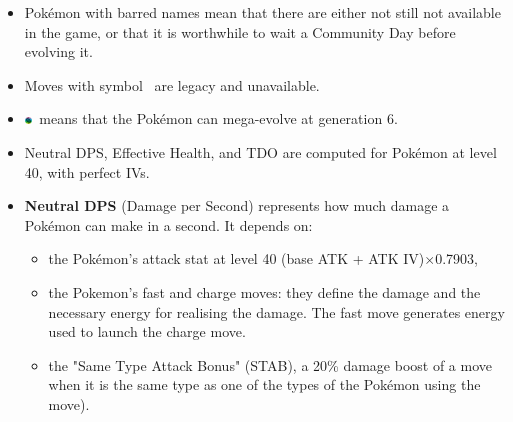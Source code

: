 \documentclass[12pt]{beamer}
\newcommand{\megaevol}{\includegraphics[width=0.2cm]{../../images/megaevolve}}
\begin{document}
\begin{frame}
\begin{block}{}
\begin{footnotesize}
\begin{itemize}
  \item Pok\'emon with barred names mean that there are either not still not available in the game, or that it is worthwhile to wait a Community Day before evolving it.
  \item Moves with symbol \dag~are legacy and unavailable.
  \item \megaevol~means that the Pok\'emon can mega-evolve at generation 6.
  \item Neutral DPS, Effective Health, and TDO are computed for Pok\'emon at level 40, with perfect IVs. 
  \item \textbf{Neutral DPS} (Damage per Second) represents how much damage a Pok\'emon can make in a second. It depends on:
  \begin{itemize}
  \item \footnotesize the Pok\'emon's attack stat at level 40 (base ATK + ATK IV)$\times$0.7903, 
  \item \footnotesize the Pokemon's fast and charge moves: they define the damage and the necessary energy for realising the damage. The fast move generates energy used to launch the charge move.
  \item \footnotesize the "Same Type Attack Bonus" (STAB), a 20\% damage boost of a move when it is the same type as one of the types of the Pokémon using the move). 
\end{itemize}

\begin{center}



\end{center}
\end{itemize}
\end{footnotesize}
\end{block}
\end{frame}
\end{document}
